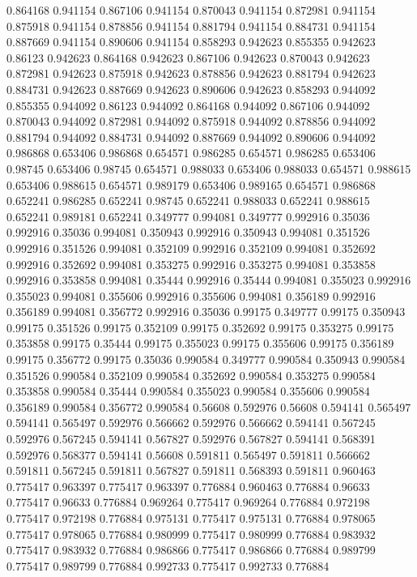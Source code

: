 0.864168 0.941154
0.867106 0.941154
0.870043 0.941154
0.872981 0.941154
0.875918 0.941154
0.878856 0.941154
0.881794 0.941154
0.884731 0.941154
0.887669 0.941154
0.890606 0.941154
0.858293 0.942623
0.855355 0.942623
0.86123 0.942623
0.864168 0.942623
0.867106 0.942623
0.870043 0.942623
0.872981 0.942623
0.875918 0.942623
0.878856 0.942623
0.881794 0.942623
0.884731 0.942623
0.887669 0.942623
0.890606 0.942623
0.858293 0.944092
0.855355 0.944092
0.86123 0.944092
0.864168 0.944092
0.867106 0.944092
0.870043 0.944092
0.872981 0.944092
0.875918 0.944092
0.878856 0.944092
0.881794 0.944092
0.884731 0.944092
0.887669 0.944092
0.890606 0.944092
0.986868 0.653406
0.986868 0.654571
0.986285 0.654571
0.986285 0.653406
0.98745 0.653406
0.98745 0.654571
0.988033 0.653406
0.988033 0.654571
0.988615 0.653406
0.988615 0.654571
0.989179 0.653406
0.989165 0.654571
0.986868 0.652241
0.986285 0.652241
0.98745 0.652241
0.988033 0.652241
0.988615 0.652241
0.989181 0.652241
0.349777 0.994081
0.349777 0.992916
0.35036 0.992916
0.35036 0.994081
0.350943 0.992916
0.350943 0.994081
0.351526 0.992916
0.351526 0.994081
0.352109 0.992916
0.352109 0.994081
0.352692 0.992916
0.352692 0.994081
0.353275 0.992916
0.353275 0.994081
0.353858 0.992916
0.353858 0.994081
0.35444 0.992916
0.35444 0.994081
0.355023 0.992916
0.355023 0.994081
0.355606 0.992916
0.355606 0.994081
0.356189 0.992916
0.356189 0.994081
0.356772 0.992916
0.35036 0.99175
0.349777 0.99175
0.350943 0.99175
0.351526 0.99175
0.352109 0.99175
0.352692 0.99175
0.353275 0.99175
0.353858 0.99175
0.35444 0.99175
0.355023 0.99175
0.355606 0.99175
0.356189 0.99175
0.356772 0.99175
0.35036 0.990584
0.349777 0.990584
0.350943 0.990584
0.351526 0.990584
0.352109 0.990584
0.352692 0.990584
0.353275 0.990584
0.353858 0.990584
0.35444 0.990584
0.355023 0.990584
0.355606 0.990584
0.356189 0.990584
0.356772 0.990584
0.56608 0.592976
0.56608 0.594141
0.565497 0.594141
0.565497 0.592976
0.566662 0.592976
0.566662 0.594141
0.567245 0.592976
0.567245 0.594141
0.567827 0.592976
0.567827 0.594141
0.568391 0.592976
0.568377 0.594141
0.56608 0.591811
0.565497 0.591811
0.566662 0.591811
0.567245 0.591811
0.567827 0.591811
0.568393 0.591811
0.960463 0.775417
0.963397 0.775417
0.963397 0.776884
0.960463 0.776884
0.96633 0.775417
0.96633 0.776884
0.969264 0.775417
0.969264 0.776884
0.972198 0.775417
0.972198 0.776884
0.975131 0.775417
0.975131 0.776884
0.978065 0.775417
0.978065 0.776884
0.980999 0.775417
0.980999 0.776884
0.983932 0.775417
0.983932 0.776884
0.986866 0.775417
0.986866 0.776884
0.989799 0.775417
0.989799 0.776884
0.992733 0.775417
0.992733 0.776884
